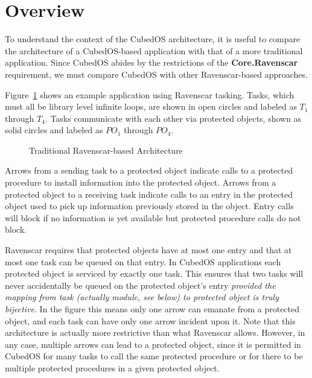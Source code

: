 
\section{Overview}
\label{sec:overview}

To understand the context of the CubedOS architecture, it is useful to compare the architecture
of a CubedOS-based application with that of a more traditional application. Since CubedOS abides
by the restrictions of the \textbf{Core.Ravenscar} requirement, we must compare CubedOS with
other Ravenscar-based approaches.

Figure~\ref{fig:traditional-architecture} shows an example application using Ravenscar tasking.
Tasks, which must all be library level infinite loops, are shown in open circles and labeled as
$T_1$ through $T_4$. Tasks communicate with each other via protected objects, shown as solid
circles and labeled as $PO_1$ through $PO_4$.

\begin{figure}[tbhp]
  \center
  \caption{Traditional Ravenscar-based Architecture}
  \label{fig:traditional-architecture}
\end{figure}

Arrows from a sending task to a protected object indicate calls to a protected procedure to
install information into the protected object. Arrows from a protected object to a receiving
task indicate calls to an entry in the protected object used to pick up information previously
stored in the object. Entry calls will block if no information is yet available but protected
procedure calls do not block.

Ravenscar requires that protected objects have at most one entry and that at most one task can
be queued on that entry. In CubedOS applications each protected object is serviced by exactly
one task. This ensures that two tasks will never accidentally be queued on the protected
object's entry \emph{provided the mapping from task (actually module, see below) to protected
  object is truly bijective}. In the figure this means only one arrow can emanate from a
protected object, and each task can have only one arrow incident upon it. Note that this
architecture is actually more restrictive than what Ravenscar allows. However, in any case,
multiple arrows can lead to a protected object, since it is permitted in CubedOS for many tasks
to call the same protected procedure or for there to be multiple protected procedures in a given
protected object.

